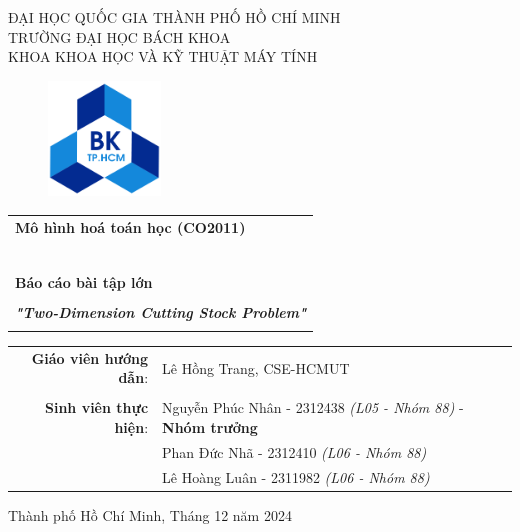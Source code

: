 \begin{titlepage}
\begin{center}
ĐẠI HỌC QUỐC GIA THÀNH PHỐ HỒ CHÍ MINH\\
TRƯỜNG ĐẠI HỌC BÁCH KHOA \\
KHOA KHOA HỌC VÀ KỸ THUẬT MÁY TÍNH
\end{center}

\vspace{1cm}

\begin{figure}[h!]
\begin{center}
\includegraphics[width=3cm]{Images/hcmut.png}
\end{center}
\end{figure}

\vspace{1cm}


\begin{center}
\begin{tabular}{c}
\multicolumn{1}{l}{\textbf{{\Large Mô hình hoá toán  học (CO2011)}}}\\
~~\\
\hline
\\
\multicolumn{1}{l}{\textbf{{\Large Báo cáo bài tập lớn}}}\\
\\
\textbf{\textit{{\Large "Two-Dimension Cutting Stock Problem"}}}\\
\\
\hline
\end{tabular}
\end{center}

\vspace{2cm}

\begin{table}[h]
\centering
    \begin{tabular}{rl}
    \hspace{2 cm}\textbf{Giáo viên hướng dẫn}:
    & Lê Hồng Trang, CSE-HCMUT\\

    & \\[5pt]
    \textbf{Sinh viên thực hiện}: &  Nguyễn Phúc Nhân - 2312438 \emph{(L05 - Nhóm 88)} - \textbf{Nhóm trưởng} \\
    & Phan Đức Nhã - 2312410 \emph{(L06 - Nhóm 88)} \\
    & Lê Hoàng Luân - 2311982 \emph{(L06 - Nhóm 88)} \\
    \end{tabular}
\end{table}

\begin{center}
{\footnotesize Thành phố Hồ Chí Minh, Tháng 12 năm 2024}
\end{center}
\end{titlepage}
\pagebreak
